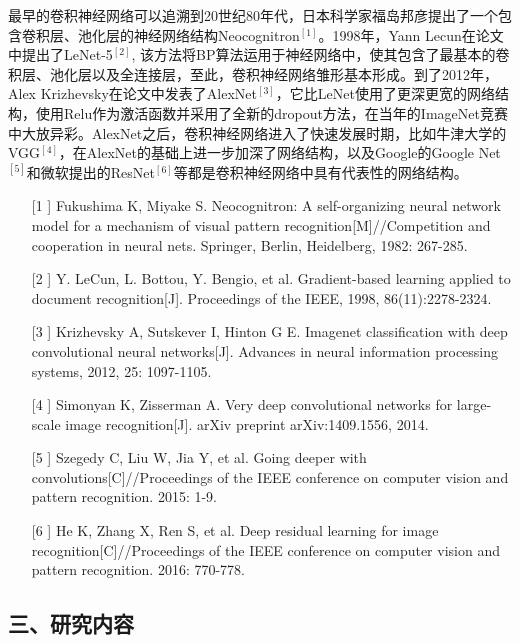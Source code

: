 \documentclass[UTF8,zihao=-4]{oucart}
\begin{document}
\begin{framed}
最早的卷积神经网络可以追溯到20世纪80年代，日本科学家福岛邦彦提出了一个包含卷积层、池化层的神经网络结构Neocognitron$^[1]$。1998年，Yann Lecun在论文中提出了LeNet-5$^[2]$, 该方法将BP算法运用于神经网络中，使其包含了最基本的卷积层、池化层以及全连接层，至此，卷积神经网络雏形基本形成。到了2012年，Alex Krizhevsky在论文中发表了AlexNet$^[3]$，它比LeNet使用了更深更宽的网络结构，使用Relu作为激活函数并采用了全新的dropout方法，在当年的ImageNet竞赛中大放异彩。AlexNet之后，卷积神经网络进入了快速发展时期，比如牛津大学的VGG$^[4]$，在AlexNet的基础上进一步加深了网络结构，以及Google的Google Net$^[5]$和微软提出的ResNet$^[6]$等都是卷积神经网络中具有代表性的网络结构。

\begin{itemize}
	\item[[1]]
	Fukushima K, Miyake S. Neocognitron: A self-organizing neural network model for a mechanism of visual pattern recognition[M]//Competition and cooperation in neural nets. Springer, Berlin, Heidelberg, 1982: 267-285.

	\item[[2]]
	Y. LeCun, L. Bottou, Y. Bengio, et al. Gradient-based learning applied to document recognition[J]. Proceedings of the IEEE, 1998, 86(11):2278-2324.

	\item[[3]]
	Krizhevsky A, Sutskever I, Hinton G E. Imagenet classification with deep convolutional neural networks[J]. Advances in neural information processing systems, 2012, 25: 1097-1105.

	\item[[4]]
	Simonyan K, Zisserman A. Very deep convolutional networks for large-scale image recognition[J]. arXiv preprint arXiv:1409.1556, 2014.

	\item[[5]]
	Szegedy C, Liu W, Jia Y, et al. Going deeper with convolutions[C]//Proceedings of the IEEE conference on computer vision and pattern recognition. 2015: 1-9.

	\item[[6]]
	He K, Zhang X, Ren S, et al. Deep residual learning for image recognition[C]//Proceedings of the IEEE conference on computer vision and pattern recognition. 2016: 770-778.

\end{itemize}


\end{framed}

\subsection*{三、研究内容}
\end{document}
